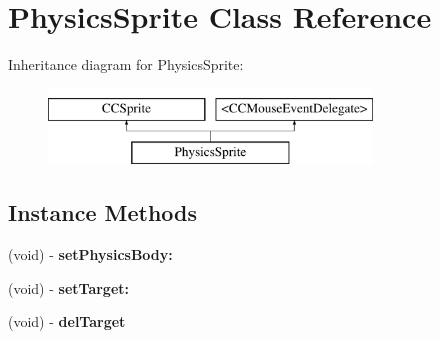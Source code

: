 \hypertarget{interface_physics_sprite}{\section{Physics\-Sprite Class Reference}
\label{db/d8a/interface_physics_sprite}
}
Inheritance diagram for Physics\-Sprite\-:\begin{figure}[H]
\begin{center}
\leavevmode
\includegraphics[height=2.000000cm]{db/d8a/interface_physics_sprite}
\end{center}
\end{figure}
\subsection*{Instance Methods}
\begin{DoxyCompactItemize}
\item 
\hypertarget{interface_physics_sprite_a853b9462e896123262409338f932b76a}{(void) -\/ {\bfseries set\-Physics\-Body\-:}}\label{db/d8a/interface_physics_sprite_a853b9462e896123262409338f932b76a}

\item 
\hypertarget{interface_physics_sprite_a1a663e8f4b61843f86825acf96ea49da}{(void) -\/ {\bfseries set\-Target\-:}}\label{db/d8a/interface_physics_sprite_a1a663e8f4b61843f86825acf96ea49da}

\item 
\hypertarget{interface_physics_sprite_a7f7f8bd12fb3436017b2ee2ee83d679b}{(void) -\/ {\bfseries del\-Target}}\label{db/d8a/interface_physics_sprite_a7f7f8bd12fb3436017b2ee2ee83d679b}

\end{DoxyCompactItemize}
